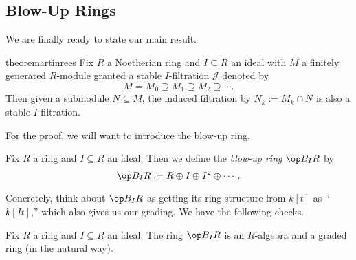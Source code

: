 \subsection{Blow-Up Rings}
We are finally ready to state our main result.
\begin{restatable}{theorem}{artinrees} \label{thm:artinrees}
	Fix $R$ a Noetherian ring and $I\subseteq R$ an ideal with $M$ a finitely generated $R$-module granted a stable $I$-filtration $\mathcal J$ denoted by
	\[M=M_0\supseteq M_1\supseteq M_2\supseteq\cdots.\]
	Then given a submodule $N\subseteq M$, the induced filtration by $N_k:=M_k\cap N$ is also a stable $I$-filtration.
\end{restatable}
\noindent For the proof, we will want to introduce the blow-up ring.
\begin{definition}
	Fix $R$ a ring and $I\subseteq R$ an ideal. Then we define the \textit{blow-up ring} $\op B_IR$ by
	\[\op B_IR:=R\oplus I\oplus I^2\oplus\cdots.\]
\end{definition}
Concretely, think about $\op B_IR$ as getting its ring structure from $k[t]$ as ``$k[It]$,'' which also gives us our grading. We have the following checks.
\begin{lem}
	Fix $R$ a ring and $I\subseteq R$ an ideal. The ring $\op B_IR$ is an $R$-algebra and a graded ring (in the natural way).
\end{lem}

